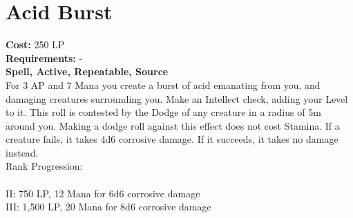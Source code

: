 \section{Acid Burst}\label{spell:acidBurst}
\textbf{Cost:} 250 LP\\
\textbf{Requirements:} -\\
\textbf{Spell, Active, Repeatable, Source}\\
For 3 AP and 7 Mana you create a burst of acid emanating from you, and damaging creatures surrounding you.
Make an Intellect check, adding your Level to it.
This roll is contested by the Dodge of any creature in a radius of 5m around you.
Making a dodge roll against this effect does not cost Stamina.
If a creature fails, it takes 4d6 corrosive damage.
If it succeeds, it takes no damage instead.
\\
Rank Progression:\\
\\
II: 750 LP, 12 Mana for 6d6 corrosive damage\\
III: 1,500 LP, 20 Mana for 8d6 corrosive damage\\
